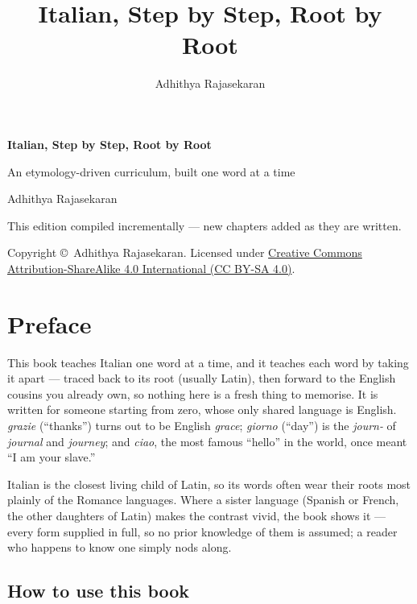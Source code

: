 \documentclass[11pt,twoside]{book}
\title{\Huge Italian, Step by Step, Root by Root}
\author{Adhithya Rajasekaran}
\date{}
\begin{document}
\frontmatter

\begin{titlepage}
  \centering
  \vspace*{3cm}
  {\Huge\bfseries Italian, Step by Step, Root by Root\par}
  \vspace{1cm}
  {\Large An etymology-driven curriculum, built one word at a time\par}
  \vspace{1.5cm}
  {\large Adhithya Rajasekaran\par}
  \vfill
  {\large This edition compiled incrementally --- new chapters added as they
  are written.\par}
  \vspace{2cm}
  {\normalsize
    Copyright \copyright\ Adhithya Rajasekaran. Licensed under
    \href{https://creativecommons.org/licenses/by-sa/4.0/}%
    {Creative Commons Attribution-ShareAlike 4.0 International (CC BY-SA 4.0)}.\par
  }
\end{titlepage}

\chapter*{Preface}

This book teaches Italian one word at a time, and it teaches each word by
taking it apart --- traced back to its root (usually Latin), then forward to the
English cousins you already own, so nothing here is a fresh thing to memorise.
It is written for someone starting from zero, whose only shared language is
English. \emph{grazie} (``thanks'') turns out to be English
\emph{grace}; \emph{giorno} (``day'') is the \emph{journ-} of \emph{journal} and
\emph{journey}; and \emph{ciao}, the most famous ``hello'' in the world, once
meant ``I am your slave.''

Italian is the closest living child of Latin, so its words often wear their
roots most plainly of the Romance languages. Where a sister language (Spanish or
French, the other daughters of Latin) makes the contrast vivid, the book shows
it --- every form supplied in full, so no prior knowledge of them is assumed; a
reader who happens to know one simply nods along.

\section*{How to use this book}
\end{document}
